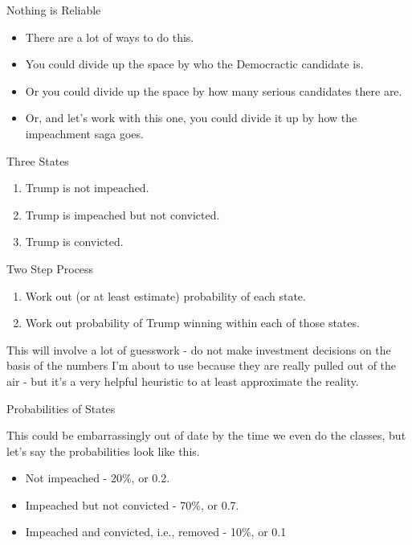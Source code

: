 \documentclass[
  ignorenonframetext,
]{beamer}
\providecommand{\tightlist}{%
  \setlength{\itemsep}{0pt}\setlength{\parskip}{0pt}}
\renewcommand{\,}{\text{, }}
\begin{document}
\begin{frame}{Nothing is Reliable}
\protect\hypertarget{nothing-is-reliable}{}

\begin{itemize}[<+->]
\tightlist
\item
  There are a lot of ways to do this.
\item
  You could divide up the space by who the Democractic candidate is.
\item
  Or you could divide up the space by how many serious candidates there
  are.
\item
  Or, and let's work with this one, you could divide it up by how the
  impeachment saga goes.
\end{itemize}

\end{frame}

\begin{frame}{Three States}
\protect\hypertarget{three-states}{}

\begin{enumerate}
\tightlist
\item
  Trump is not impeached.
\item
  Trump is impeached but not convicted.
\item
  Trump is convicted.
\end{enumerate}

\end{frame}

\begin{frame}{Two Step Process}
\protect\hypertarget{two-step-process}{}

\begin{enumerate}
\tightlist
\item
  Work out (or at least estimate) probability of each state.
\item
  Work out probability of Trump winning within each of those states.
\end{enumerate}

This will involve a lot of guesswork - do not make investment decisions
on the basis of the numbers I'm about to use because they are really
pulled out of the air - but it's a very helpful heuristic to at least
approximate the reality.

\end{frame}

\begin{frame}{Probabilities of States}
\protect\hypertarget{probabilities-of-states}{}

This could be embarrassingly out of date by the time we even do the
classes, but let's say the probabilities look like this.

\begin{itemize}
\tightlist
\item
  Not impeached - 20\%, or 0.2.
\item
  Impeached but not convicted - 70\%, or 0.7.
\item
  Impeached and convicted, i.e., removed - 10\%, or 0.1
\end{itemize}

\end{frame}
\end{document}
